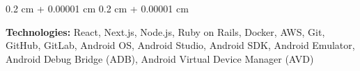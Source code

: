 \documentclass[10pt, a4paper]{article}
\newenvironment{onecolentry}{
    \begin{adjustwidth}{
        0.2 cm + 0.00001 cm
    }{
        0.2 cm + 0.00001 cm
    }
}{
    \end{adjustwidth}
} %
\begin{document}
        \vspace{0.2 cm}

        \begin{onecolentry}
            \textbf{Technologies:} React, Next.js, Node.js, Ruby on Rails, Docker, AWS, Git, GitHub, GitLab, Android OS, Android Studio, Android SDK, Android Emulator, Android Debug Bridge (ADB), Android Virtual Device Manager (AVD)
        \end{onecolentry}


    
\end{document}
